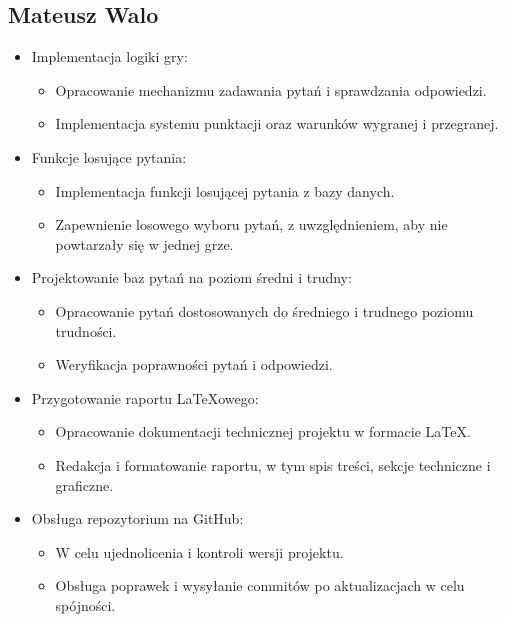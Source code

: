 \documentclass[]{article}
\begin{document}
\subsection{Mateusz Walo}
	\begin{itemize}
		\item Implementacja logiki gry:
		\begin{itemize}
			\item Opracowanie mechanizmu zadawania pytań i sprawdzania odpowiedzi.
			\item Implementacja systemu punktacji oraz warunków wygranej i przegranej.
		\end{itemize}
		\item Funkcje losujące pytania:
		\begin{itemize}
			\item Implementacja funkcji losującej pytania z bazy danych.
			\item Zapewnienie losowego wyboru pytań, z uwzględnieniem, aby nie powtarzały się w jednej grze.
		\end{itemize}
		\item Projektowanie baz pytań na poziom średni i trudny:
		\begin{itemize}
			\item Opracowanie pytań dostosowanych do średniego i trudnego poziomu trudności.
			\item Weryfikacja poprawności pytań i odpowiedzi.
		\end{itemize}
			\item Przygotowanie raportu LaTeXowego:
		\begin{itemize}
			\item Opracowanie dokumentacji technicznej projektu w formacie LaTeX.
			\item Redakcja i formatowanie raportu, w tym spis treści, sekcje techniczne i graficzne.		
		\end{itemize}
			\item Obsługa repozytorium na GitHub:
		\begin{itemize}
			\item W celu ujednolicenia i kontroli wersji projektu.
			\item Obsługa poprawek i wysyłanie commitów po aktualizacjach w celu spójności.
	\end{itemize}
\end{itemize}
\end{document}
